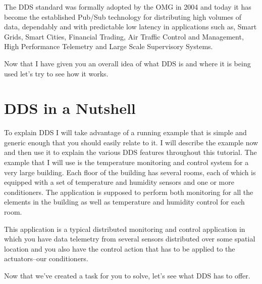 The \ac{DDS} standard was formally adopted by the \ac{OMG} in 2004 and today it has 
become the established \ac{Pub/Sub} technology for distributing high volumes of data, 
dependably and with predictable low latency in applications such as, Smart Grids,
Smart Cities, Financial Trading, Air Traffic Control and Management,  High Performance Telemetry and  Large Scale Supervisory Systems. 

Now that I have given you an overall idea of what \ac{DDS} is and where it is being used 
let's try to see how it works.



\section {\ac{DDS} in  a Nutshell}
To explain \ac{DDS} I will take advantage of a running example that is 
simple and generic enough that you should easily relate to it. 
I will describe the example now and then use it to explain 
the various \ac{DDS} features throughout this tutorial. 
The example that I will use is the temperature monitoring and 
control system for a very large building. Each floor of 
the building has several rooms, each of which is equipped with 
a set of temperature and humidity sensors and one or more conditioners. 
The application is supposed to perform both monitoring for all the 
elements in the building as well as temperature and humidity control 
for each room. 

This application is a typical distributed monitoring and control 
application in which you have data telemetry from several sensors 
distributed over some spatial location and you also have the control 
action that has to be applied to the actuators--our conditioners. 

Now that we've created a task for you to solve, let's see what \ac{DDS} 
has to offer.

